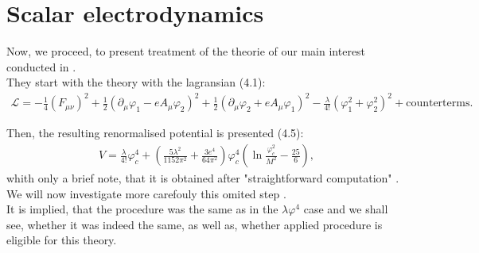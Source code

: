 \section{Scalar electrodynamics}
Now, we proceed, to present treatment of the theorie of our main interest conducted in 
\cite{Coleman1973}. \\
They start with the theory with the lagransian \cite{Coleman1973}(4.1):
\begin{align}\label{CW_electrodynamics}
\mathcal{L} = -\frac{1}{4}(F_{\mu\nu})^2+\frac{1}{2}(\partial_\mu\varphi_1-eA_\mu\varphi_2)^2 + 
\frac{1}{2}(\partial_\mu\varphi_2+eA_\mu\varphi_1)^2-\frac{\lambda}{4!}(\varphi_1^2+\varphi_2^2)^2 
 + \textrm{counterterms}.
\end{align}

Then, the resulting renormalised potential is presented \cite{Coleman1973}(4.5):
\begin{align}
V = \frac{\lambda}{4!}\varphi_c^4+\left(\frac{5\lambda^2}{1152\pi^2}+\frac{3e^4}{64\pi^2}\right)
\varphi_c^4\left(\ln\frac{\varphi_c^2}{M^2}-\frac{25}{6}\right),
\end{align}
whith only a brief note, that it is obtained after "straightforward computation" 
.\\
We will now investigate more carefouly this omited step
.\\
It is implied, that the procedure was the same as in the $\lambda\varphi^4$ case and we shall see, 
whether it was indeed the same, as well as, whether applied procedure is eligible for this theory.\\

